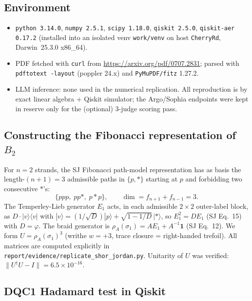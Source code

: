 \documentclass[11pt]{article}
\begin{document}
\subsection{Environment}
\begin{itemize}
\item \texttt{python 3.14.0}, \texttt{numpy 2.5.1}, \texttt{scipy 1.18.0},
      \texttt{qiskit 2.5.0}, \texttt{qiskit-aer 0.17.2} (installed into an
      isolated venv \texttt{work/venv} on host \texttt{CherryRd},
      Darwin~25.3.0 x86\_64).
\item PDF fetched with \texttt{curl} from
      \url{https://arxiv.org/pdf/0707.2831}; parsed with
      \texttt{pdftotext -layout} (poppler 24.x) and \texttt{PyMuPDF/fitz}
      1.27.2.
\item LLM inference: none used in the numerical replication. All
      reproduction is by exact linear algebra + Qiskit simulator; the
      Argo/Sophia endpoints were kept in reserve only for the (optional)
      3-judge scoring pass.
\end{itemize}

\subsection{Constructing the Fibonacci representation of $B_2$}

For $n=2$ strands, the SJ Fibonacci path-model representation has as
basis the length-$(n{+}1)=3$ admissible paths in $\{p,*\}$ starting at $p$
and forbidding two consecutive $*$'s:
\[
\{pp p,\;pp*,\;p*p\},\qquad \dim=f_{n+1}\!+\!f_{n-1}=3.
\]
The Temperley-Lieb generator $E_1$ acts, in each admissible $2{\times}2$
outer-label block, as $D\cdot |v\rangle\!\langle v|$ with
$|v\rangle=(1/\sqrt D)|p\rangle+\sqrt{1-1/D}\,|*\rangle$, so $E_1^2=D E_1$
(SJ Eq.~15) with $D=\varphi$. The braid generator is
$\rho_A(\sigma_1)=A E_1 + A^{-1}\mathbf 1$ (SJ Eq.~12). We form
$U=\rho_A(\sigma_1)^3$ (writhe $w=+3$, trace closure = right-handed
trefoil). All matrices are computed explicitly in
\texttt{report/evidence/replicate\_shor\_jordan.py}. Unitarity of $U$ was
verified: $\|U^\dagger U - I\|=6.5\times10^{-16}$.

\subsection{DQC1 Hadamard test in Qiskit}\label{sec:dqc1}
\end{document}
